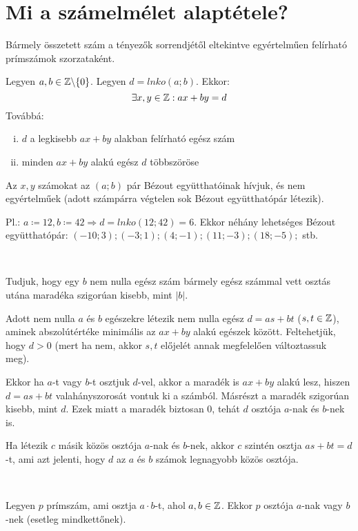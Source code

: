 
\section{Mi a számelmélet alaptétele?}
\label{010}

\begin{theorem}
Bármely összetett szám a tényezők sorrendjétől eltekintve egyértelműen
felírható prímszámok szorzataként.
\end{theorem}

\begin{proof4long}
\begin{lemma4}
\label{lemma:bezout}
Legyen $a, b \in \mathbb{Z} \backslash \{0\}$. Legyen $d = lnko(a; b)$. Ekkor:
\[
  \exists x, y \in \mathbb{Z}: ax + by = d
\]
Továbbá:
\begin{enumerate}[i)]
\item $d$ a legkisebb $ax + by$ alakban felírható egész szám
\item minden $ax + by$ alakú egész $d$ többszöröse
\end{enumerate}
Az $x, y$ számokat az $(a; b)$ pár Bézout együtthatóinak hívjuk, és nem
egyértelműek (adott számpárra végtelen sok Bézout együtthatópár létezik).

Pl.: $a \coloneqq 12, b \coloneqq 42 \Rightarrow d = lnko(12; 42) = 6$. Ekkor
néhány lehetséges Bézout együtthatópár:
$(-10; 3); (-3; 1); (4; -1); (11; -3); (18; -5);$ stb.
\end{lemma4}\\[-1em]
\begin{proof4}[35.1pt]
Tudjuk, hogy egy $b$ nem nulla egész szám bármely egész számmal vett osztás
utána maradéka szigorúan kisebb, mint $|b|$.

Adott nem nulla $a$ és $b$ egészekre létezik nem nulla egész
$d = as + bt$ ($s, t \in \mathbb{Z}$), aminek abszolútértéke minimális az
$ax + by$ alakú egészek között. Feltehetjük, hogy $d > 0$ (mert ha nem, akkor
$s, t$ előjelét annak megfelelően változtassuk meg).

Ekkor ha $a$-t vagy $b$-t osztjuk $d$-vel, akkor a maradék is $ax + by$ alakú
lesz, hiszen $d = as + bt$ valahányszorosát vontuk ki a számból. Másrészt a
maradék szigorúan kisebb, mint $d$. Ezek miatt a maradék biztosan $0$, tehát 
$d$ osztója $a$-nak és $b$-nek is.

Ha létezik $c$ másik közös osztója $a$-nak és $b$-nek, akkor $c$ szintén osztja
$as + bt = d$-t, ami azt jelenti, hogy $d$ az $a$ és $b$ számok legnagyobb
közös osztója.
\end{proof4}\\[-1em]
\begin{lemma3}
\label{lemma:euclid}
Legyen $p$ prímszám, ami osztja $a \cdot b$-t, ahol $a, b \in \mathbb{Z}$. Ekkor
$p$ osztója $a$-nak vagy $b$-nek (esetleg mindkettőnek).


\end{lemma3}
\end{proof4long}
